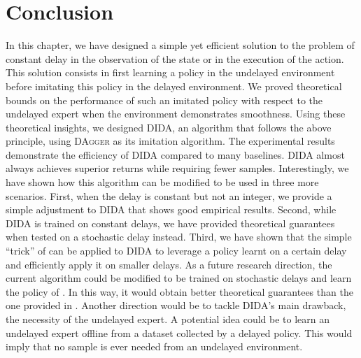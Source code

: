 \section{Conclusion}
In this chapter, we have designed a simple yet efficient solution to the problem of constant delay in the observation of the state or in the execution of the action.
This solution consists in first learning a policy in the undelayed environment before imitating this policy in the delayed environment.
We proved theoretical bounds on the performance of such an imitated policy with respect to the undelayed expert when the environment demonstrates smoothness. 
Using these theoretical insights, we designed DIDA, an algorithm that follows the above principle, using \textsc{DAgger} as its imitation algorithm. 
The experimental results demonstrate the efficiency of DIDA compared to many baselines.
DIDA almost always achieves superior returns while requiring fewer samples.
Interestingly, we have shown how this algorithm can be modified to be used in three more scenarios.
First, when the delay is constant but not an integer, we provide a simple adjustment to DIDA that shows good empirical results. 
Second, while DIDA is trained on constant delays, we have provided theoretical guarantees when tested on a stochastic delay instead.
Third, we have shown that the simple ``trick'' of  can be applied to DIDA to leverage a policy learnt on a certain delay and efficiently apply it on smaller delays. 
As a future research direction, the current algorithm could be modified to be trained on stochastic delays and learn the policy of . 
In this way, it would obtain better theoretical guarantees than the one provided in .
Another direction would be to tackle DIDA's main drawback, the necessity of the undelayed expert. 
A potential idea could be to learn an undelayed expert offline from a dataset collected by a delayed policy. 
This would imply that no sample is ever needed from an undelayed environment.